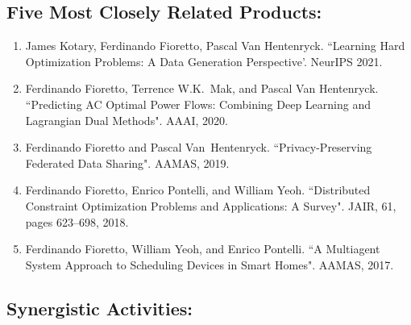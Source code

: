 \documentclass[times, 10pt]{article}
\begin{document}
\subsection*{\sc Five Most Closely Related Products:}

\begin{enumerate}[leftmargin=*, parsep=2pt, itemsep=2pt, topsep=2pt]
\item 
	James Kotary, Ferdinando Fioretto, Pascal Van Hentenryck.
	``Learning Hard Optimization Problems: A Data Generation Perspective'. NeurIPS 2021.


\item 
	Ferdinando Fioretto, Terrence W.K.~Mak, and Pascal Van Hentenryck.
	``Predicting AC Optimal Power Flows: Combining Deep Learning and Lagrangian Dual Methods".
  	AAAI, 2020.


\item
	Ferdinando Fioretto and Pascal Van~Hentenryck.
	``Privacy-Preserving Federated Data Sharing".
  	AAMAS, 2019.

\item
	Ferdinando Fioretto, Enrico Pontelli, and William Yeoh.
	{``Distributed Constraint Optimization Problems and Applications: A Survey"}.
	JAIR, 61, pages 623--698, 2018. 

\item 
	Ferdinando Fioretto,  William Yeoh, and Enrico Pontelli. 
	{``A Multiagent System Approach to Scheduling Devices in Smart Homes"}.
	AAMAS, 2017. 

\end{enumerate}


\subsection*{\sc Synergistic Activities:}
\end{document}
